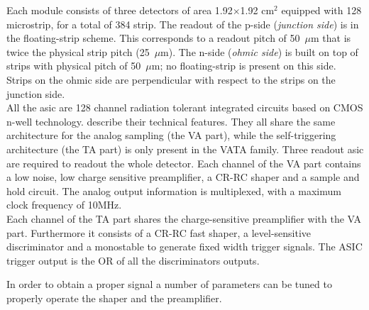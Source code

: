 Each module consists of three detectors of area 1.92$\times$1.92 cm$^2$
equipped with 128 microstrip, for a total of 384 strip. The readout of the
p-side ({\em junction side}) is in the floating-strip scheme. This corresponds
to a readout pitch of 50~$\mu$m that is twice the physical strip pitch
(25~$\mu$m). The n-side ({\em ohmic side}) is built on top of strips with physical pitch of
50~$\mu$m; no floating-strip is present on this side. Strips on the ohmic side
are perpendicular with respect to the strips on the junction side.\\

All the \gls{asic} are 128 channel radiation tolerant integrated circuits based
on CMOS n-well technology.  describe their technical
features. They all share the same architecture for the analog sampling (the VA
part), while the self-triggering architecture (the TA
part) is only present in the VATA family. Three readout \gls{asic} are required
to readout the whole detector.
Each channel of the VA part contains a low noise, low charge sensitive
preamplifier, a CR-RC shaper and a sample and hold circuit. The analog output
information is multiplexed, with a maximum clock frequency of 10MHz.\\
Each channel of the TA part shares the charge-sensitive preamplifier with the VA
part. Furthermore it consists of a CR-RC fast shaper, a level-sensitive discriminator
and a monostable to generate fixed width trigger signals. The ASIC trigger
output is the OR of all the discriminators outputs.
\begin{center}
\begin{table}
\caption{\it Technical features of the different ASICs }\label{tab:asics}
\end{table}
\end{center}
In order to obtain a proper signal a number of parameters can be tuned to
properly operate the shaper and the preamplifier.


